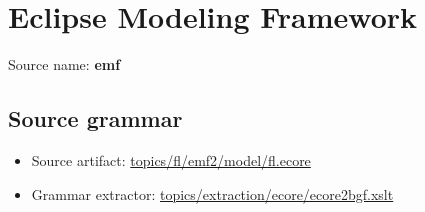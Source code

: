 \chapter{Eclipse Modeling Framework}

 Source name: \textbf{emf}

\section{Source grammar}

\begin{itemize}
\item Source artifact: \href{http://github.com/grammarware/slps/blob/master/topics/fl/emf2/model/fl.ecore}{topics/fl/emf2/model/fl.ecore}
\item Grammar extractor: \href{http://github.com/grammarware/slps/blob/master/topics/extraction/ecore/ecore2bgf.xslt}{topics/extraction/ecore/ecore2bgf.xslt}
\end{itemize}

